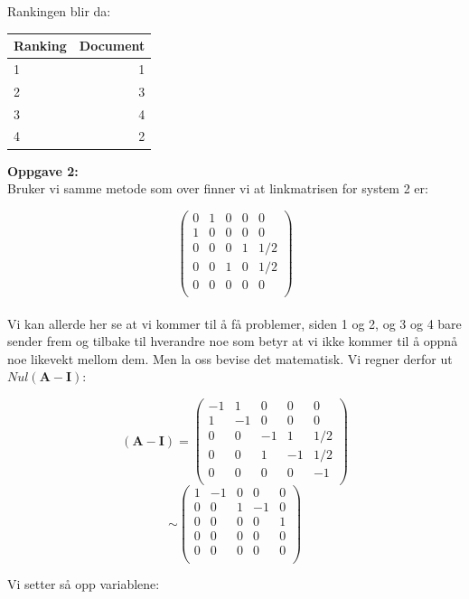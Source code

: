\documentclass[a4paper,norsk,11pt,twoside]{article}
\begin{document}
Rankingen blir da:


\begin{center}
\begin{tabular}{l | r}
Ranking & Document \\ \hline
1 & 1\\
2 & 3\\
3 & 4\\
4 & 2
\end{tabular}
\end{center}

\newpage

\textbf{Oppgave 2:}\\

Bruker vi samme metode som over finner vi at linkmatrisen for system 2 er:

$$
\begin{pmatrix}
0 & 1 & 0 & 0 & 0\\
1 & 0 & 0 & 0 & 0\\
0 & 0 & 0 & 1 & 1/2\\
0 & 0 & 1 & 0 & 1/2\\
0 & 0 & 0 & 0 & 0\\
\end{pmatrix}
$$\\

Vi kan allerde her se at vi kommer til å få problemer, siden 1 og 2, og 3 og 4 bare sender frem og tilbake til hverandre noe som betyr at vi ikke kommer til å oppnå noe likevekt mellom dem. Men la oss bevise det matematisk. Vi regner derfor ut $Nul(\textbf{A}-\textbf{I})$:

$$
(\textbf{A}-\textbf{I}) = 
\begin{pmatrix}
-1 & 1 & 0 & 0 & 0\\
1 & -1 & 0 & 0 & 0\\
0 & 0 & -1 & 1 & 1/2\\
0 & 0 & 1 & -1 & 1/2\\
0 & 0 & 0 & 0 & -1\\
\end{pmatrix}
$$
$$
\sim
\begin{pmatrix}
1 & -1 & 0 & 0 & 0\\
0 & 0 & 1 & -1 & 0\\
0 & 0 & 0 & 0 & 1\\
0 & 0 & 0 & 0 & 0\\
0 & 0 & 0 & 0 & 0\\
\end{pmatrix}
$$

Vi setter så opp variablene:
\end{document}
